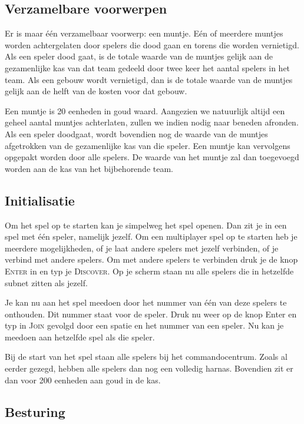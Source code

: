     \subsection{Verzamelbare voorwerpen}
    Er is maar \'e\'en verzamelbaar voorwerp: een muntje. E\'en of meerdere muntjes worden achtergelaten door spelers die dood gaan en torens die worden vernietigd. Als een speler dood gaat, is de totale waarde van de muntjes gelijk aan de gezamenlijke kas van dat team gedeeld door twee keer het aantal spelers in het team. Als een gebouw wordt vernietigd, dan is de totale waarde van de muntjes gelijk aan de helft van de kosten voor dat gebouw.

    Een muntje is 20 eenheden in goud waard. Aangezien we natuurlijk altijd een geheel aantal muntjes achterlaten, zullen we indien nodig naar beneden afronden. Als een speler doodgaat, wordt bovendien nog de waarde van de muntjes afgetrokken van de gezamenlijke kas van die speler. Een muntje kan vervolgens opgepakt worden door alle spelers. De waarde van het muntje zal dan toegevoegd worden aan de kas van het bijbehorende team.

    \subsection{Initialisatie}
	Om het spel op te starten kan je simpelweg het spel openen. Dan zit je in een spel met \'e\'en speler, namelijk jezelf. Om een multiplayer spel op te starten heb je meerdere mogelijkheden, of je laat andere spelers met jezelf verbinden, of je verbind met andere spelers. Om met andere spelers te verbinden druk je de knop \textsc{Enter} in en typ je \textsc{Discover}. Op je scherm staan nu alle spelers die in hetzelfde subnet zitten als jezelf. 
	
	Je kan nu aan het spel meedoen door het nummer van \'e\'en van deze spelers te onthouden. Dit nummer staat voor de speler. Druk nu weer op de knop {Enter} en typ in \textsc{Join} gevolgd door een spatie en het nummer van een speler. Nu kan je meedoen aan hetzelfde spel als die speler.
	
    Bij de start van het spel staan alle spelers bij het commandocentrum. Zoals al eerder gezegd, hebben alle spelers dan nog een volledig harnas. Bovendien zit er dan voor 200 eenheden aan goud in de kas.

    \FloatBarrier

    \subsection{Besturing}
    \label{sec:UI}

